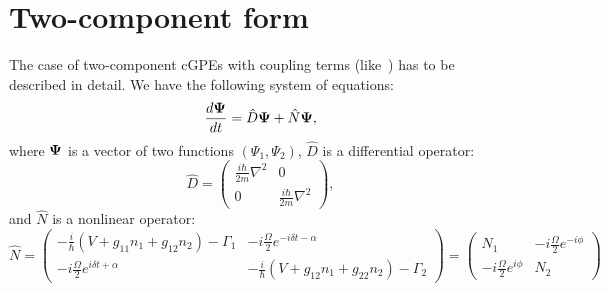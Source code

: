 \section{Two-component form}

The case of two-component cGPEs with coupling terms (like~)
has to be described in detail.
We have the following system of equations:
\begin{equation}
\label{eqn:split-step:two-comp-eqn}
	\frac{d \boldsymbol{\Psi}}{dt} = \hat{D} \boldsymbol{\Psi} + \hat{N} \boldsymbol{\Psi},
\end{equation}
where $\boldsymbol{\Psi}$ is a vector of two functions $(\Psi_1, \Psi_2)$,
$\hat{D}$ is a differential operator:
\[
	\hat{D} = \begin{pmatrix}
		\frac{i \hbar}{2 m} \nabla^2 & 0 \\
		0 & \frac{i \hbar}{2 m} \nabla^2
	\end{pmatrix},
\]
and $\hat{N}$ is a nonlinear operator:
\[
	\hat{N} = \begin{pmatrix}
		-\frac{i}{\hbar} \left( V + g_{11} n_1 + g_{12} n_2 \right) - \Gamma_1 &
		-i \frac{\Omega}{2} e^{-i \delta t - \alpha} \\
		-i \frac{\Omega}{2} e^{i \delta t + \alpha} &
		-\frac{i}{\hbar} \left( V + g_{12} n_1 + g_{22} n_2 \right) - \Gamma_2
	\end{pmatrix}
	= \begin{pmatrix}
		N_1 & -i \frac{\Omega}{2} e^{-i \phi} \\ - i \frac{\Omega}{2} e^{i \phi} & N_2
	\end{pmatrix}
\]

